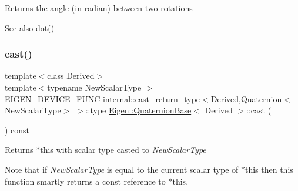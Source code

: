 \begin{DoxyReturn}{Returns}
the angle (in radian) between two rotations 
\end{DoxyReturn}
\begin{DoxySeeAlso}{See also}
\mbox{\hyperlink{class_eigen_1_1_quaternion_base_aa95c422b3d12869ed6aa46e4dd5a430a}{dot()}} 
\end{DoxySeeAlso}
\mbox{\label{class_eigen_1_1_quaternion_base_a0ba6cd48ef9b2d850eb99bfaf27474de}} 
\subsubsection{\texorpdfstring{cast()}{cast()}}
{\footnotesize\ttfamily template$<$class Derived$>$ \\
template$<$typename New\+Scalar\+Type $>$ \\
E\+I\+G\+E\+N\+\_\+\+D\+E\+V\+I\+C\+E\+\_\+\+F\+U\+NC \mbox{\hyperlink{struct_eigen_1_1internal_1_1cast__return__type}{internal\+::cast\+\_\+return\+\_\+type}}$<$Derived,\mbox{\hyperlink{class_eigen_1_1_quaternion}{Quaternion}}$<$New\+Scalar\+Type$>$ $>$\+::type \mbox{\hyperlink{class_eigen_1_1_quaternion_base}{Eigen\+::\+Quaternion\+Base}}$<$ Derived $>$\+::cast (\begin{DoxyParamCaption}{ }\end{DoxyParamCaption}) const\hspace{0.3cm}{\ttfamily [inline]}}

\begin{DoxyReturn}{Returns}
{\ttfamily $\ast$this} with scalar type casted to {\itshape New\+Scalar\+Type} 
\end{DoxyReturn}
Note that if {\itshape New\+Scalar\+Type} is equal to the current scalar type of {\ttfamily $\ast$this} then this function smartly returns a const reference to {\ttfamily $\ast$this}. \mbox{\label{class_eigen_1_1_quaternion_base_aa7bb3fc337ffa82b0ad795783eb8a2ce}} 
